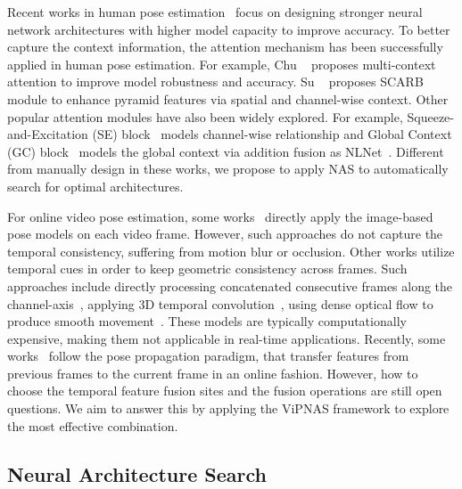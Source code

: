 \documentclass[final]{cvpr}
\begin{document}
Recent works in human pose estimation~\cite{chen2018cascaded,cheng2020higherhrnet,duan2019trb,jin2020differentiable,jin2020whole,li2019crowdpose,liu2018cascaded,newell2016stacked,sun2019deep,wei2016convolutional,xiao2018simple} focus on designing stronger neural network architectures with higher model capacity to improve accuracy. To better capture the context information, the attention mechanism has been successfully applied in human pose estimation. For example, Chu \etal ~\cite{chu2017multi} proposes multi-context attention to improve model robustness and accuracy. Su \etal ~\cite{su2019multi} proposes SCARB module to enhance pyramid features via spatial and channel-wise context. Other popular attention modules have also been widely explored. For example, Squeeze-and-Excitation (SE) block~\cite{hu2018squeeze} models channel-wise relationship and Global Context (GC) block~\cite{cao2019gcnet} models the global context via addition fusion as NLNet~\cite{wang2018non}. Different from manually design in these works, we propose to apply NAS to automatically search for optimal architectures.

For online video pose estimation, some works~\cite{jin2019multi,jin2017towards,sun2019deep,xiao2018simple,xiu2018pose,xu2020hieve} directly apply the image-based pose models on each video frame. However, such approaches do not capture the temporal consistency, suffering from motion blur or occlusion. Other works utilize temporal cues in order to keep geometric consistency across frames. Such approaches include directly processing concatenated consecutive frames along the channel-axis~\cite{pfister2014deep}, applying 3D temporal convolution~\cite{girdhar2017detect,wang2020combining}, using dense optical flow to produce smooth movement~\cite{pfister2015flowing,song2017thin}. These models are typically computationally expensive, making them not applicable in real-time applications. Recently, some works~\cite{gkioxari2016chained,lihh2019temporal,liwt2019temporal,luo2018lstm,nie2019dynamic} follow the pose propagation paradigm, that transfer features from previous frames to the current frame in an online fashion. However, how to choose the temporal feature fusion sites and the fusion operations are still open questions. We aim to answer this by applying the ViPNAS framework to explore the most effective combination.


\subsection{Neural Architecture Search}
\end{document}
